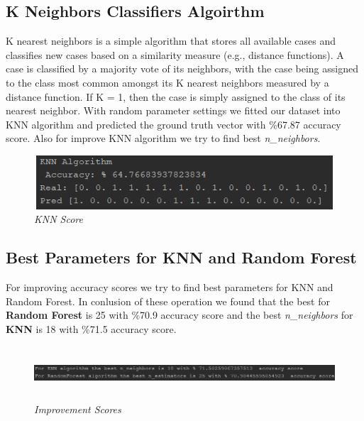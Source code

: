 \documentclass[onecolumn]{article}
\begin{document}
\subsection{K Neighbors Classifiers Algoirthm}
K nearest neighbors is a simple algorithm that stores all available cases and classifies new cases based on a similarity measure (e.g., distance functions). A case is classified by a majority vote of its neighbors, with the case being assigned to the class most common amongst its K nearest neighbors measured by a distance function. If K = 1, then the case is simply assigned to the class of its nearest neighbor. With random parameter settings we fitted our dataset into KNN algorithm and predicted the ground truth vector with \%67.87 accuracy score. Also for improve KNN algorithm we try to find best \emph{n\_neighbors}.
\clearpage
\begin{figure}[h]
\includegraphics[width=15cm, height=2cm]{KNN.png}
\caption{\emph{KNN Score}}
\centering
\end{figure}

\subsection{Best Parameters for KNN and Random Forest}
For improving accuracy scores we try to find best parameters for KNN and Random Forest. In conlusion of these operation we found that the best  for \textbf{Random Forest} is 25 with \%70.9 accuracy score and the best \emph{n\_neighbors} for \textbf{KNN} is 18 with \%71.5 accuracy score.
\begin{figure}[h]
\includegraphics[width=15cm, height=2cm]{improve.png}
\caption{\emph{Improvement Scores}}
\centering
\end{figure}
\end{document}
